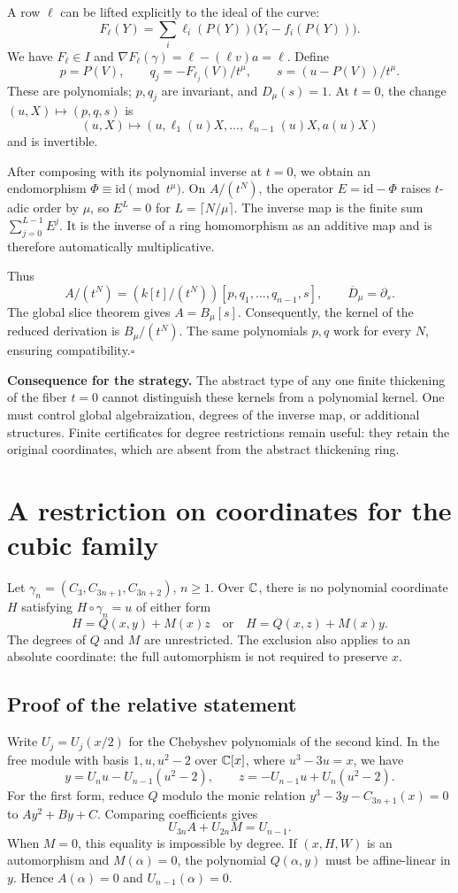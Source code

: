 A row $\ell$ can be lifted explicitly to the ideal of the curve:
\[
F_\ell(Y)=\sum_i\ell_i(P(Y))\bigl(Y_i-f_i(P(Y))\bigr).
\]
We have $F_\ell\in I$ and $\nabla F_\ell(\gamma)=\ell-(\ell v)a=\ell$. Define
\[
p=P(V),\qquad q_j=-F_{\ell_j}(V)/t^\mu,\qquad s=(u-P(V))/t^\mu.
\]
These are polynomials; $p,q_j$ are invariant, and $D_\mu(s)=1$. At $t=0$, the change $(u,X)\mapsto(p,q,s)$ is
\[
(u,X)\longmapsto(u,\ell_1(u)X,\ldots,\ell_{n-1}(u)X,a(u)X)
\]
and is invertible.

After composing with its polynomial inverse at $t=0$, we obtain an endomorphism $\Phi\equiv\mathrm{id}\pmod{t^\mu}$. On $A/(t^N)$, the operator $E=\mathrm{id}-\Phi$ raises $t$-adic order by $\mu$, so $E^L=0$ for $L=\lceil N/\mu\rceil$. The inverse map is the finite sum $\sum_{j=0}^{L-1}E^j$. It is the inverse of a ring homomorphism as an additive map and is therefore automatically multiplicative.

Thus
\[
A/(t^N)=(k[t]/(t^N))[p,q_1,\ldots,q_{n-1},s],\qquad\overline D_\mu=\partial_s.
\]
The global slice theorem gives $A=B_\mu[s]$. Consequently, the kernel of the reduced derivation is $B_\mu/(t^N)$. The same polynomials $p,q$ work for every $N$, ensuring compatibility.\hfill$\square$

\textbf{Consequence for the strategy.} The abstract type of any one finite thickening of the fiber $t=0$ cannot distinguish these kernels from a polynomial kernel. One must control global algebraization, degrees of the inverse map, or additional structures. Finite certificates for degree restrictions remain useful: they retain the original coordinates, which are absent from the abstract thickening ring.

\section{A restriction on coordinates for the cubic family}\label{sec:uniform}
Let $\gamma_n=(C_3,C_{3n+1},C_{3n+2})$, $n\ge1$. Over ${\mathbb{C}}$, there is no polynomial coordinate $H$ satisfying $H\circ\gamma_n=u$ of either form
\[
\boxed{H=Q(x,y)+M(x)z\quad\text{or}\quad H=Q(x,z)+M(x)y.}
\]
The degrees of $Q$ and $M$ are unrestricted. The exclusion also applies to an absolute coordinate: the full automorphism is not required to preserve $x$.

\subsection*{Proof of the relative statement}
Write $U_j=U_j(x/2)$ for the Chebyshev polynomials of the second kind. In the free module with basis $1,u,u^2-2$ over ${\mathbb{C}}[x]$, where $u^3-3u=x$, we have
\[
y=U_nu-U_{n-1}(u^2-2),\qquad
z=-U_{n-1}u+U_n(u^2-2).
\]
For the first form, reduce $Q$ modulo the monic relation
$y^3-3y-C_{3n+1}(x)=0$ to $Ay^2+By+C$. Comparing coefficients gives
\[
U_{3n}A+U_{2n}M=U_{n-1}.\tag{6.1}
\]
When $M=0$, this equality is impossible by degree. If $(x,H,W)$ is an automorphism and $M(\alpha)=0$, the polynomial $Q(\alpha,y)$ must be affine-linear in $y$. Hence $A(\alpha)=0$ and $U_{n-1}(\alpha)=0$.

